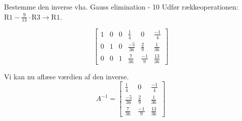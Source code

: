 \documentclass{article}
\begin{document}
\begin{exercise}{Bestemme den inverse vha. Gauss elimination - 10}
\hint
Udfør rækkeoperationen: $\text{R1} - \frac{9}{13} \cdot \text{R3} \to \text{R1}$.

\hint
\[
\left[\begin{array}{ccc|ccc}
1 & 0 & 0 & \frac{1}{4} & 0 & \frac{-1}{4} \\
0 & 1 & 0 & \frac{-5}{36} & \frac{2}{9} & \frac{1}{36} \\
0 & 0 & 1 & \frac{7}{36} & \frac{-1}{9} & \frac{13}{36}
\end{array} \right]
\]


\hint
Vi kan nu aflæse værdien af den inverse.
\[
A^{-1} = \left[\begin{array}{ccc}
\frac{1}{4} & 0 & \frac{-1}{4} \\
\frac{-5}{36} & \frac{2}{9} & \frac{1}{36} \\
\frac{7}{36} & \frac{-1}{9} & \frac{13}{36}
\end{array} \right]
\]


\end{exercise}
\end{document}

